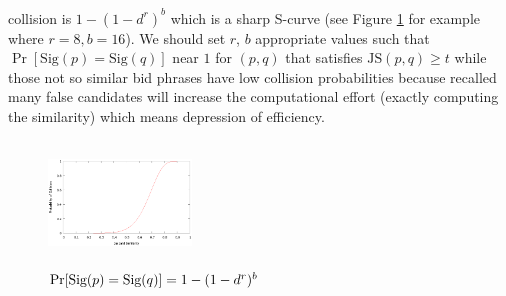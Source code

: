 collision is $1-(1-d^r)^b$ which is a sharp S-curve (see Figure
        \ref{fig:scurve} for example where $r=8, b=16$).  
We should set $r$, $b$ appropriate values such that %
$\Pr[\text{Sig}(p)=\text{Sig}(q)]$ near $1$ for $(p,q)$ that satisfies
$\text{JS}(p,q)\geq t$ while those not so similar bid phrases have low
collision probabilities because recalled many false candidates will increase the
computational effort (exactly computing the similarity) which means
depression of efficiency.
\begin{figure}
\centering
\includegraphics[width=1.5in, height=1.3in]{figures/scurve.eps}
\caption{$\Pr[\textnormal{Sig}(p)=\textnormal{Sig}(q)]=1-(1-d^r)^b$}
\label{fig:scurve}
\end{figure}



